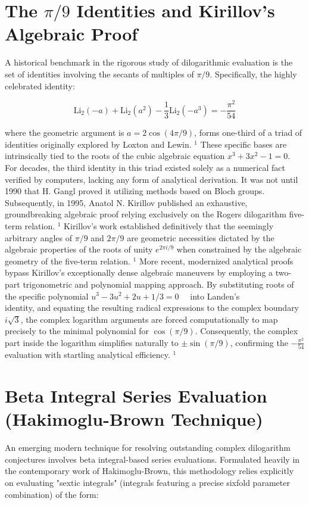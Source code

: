\documentclass[10pt]{article}
\begin{document}
\section*{The $\pi / 9$ Identities and Kirillov's Algebraic Proof}
A historical benchmark in the rigorous study of dilogarithmic evaluation is the set of identities involving the secants of multiples of $\pi / 9$. Specifically, the highly celebrated identity:

$$
\mathrm{Li}_{2}(-a)+\mathrm{Li}_{2}\left(a^{2}\right)-\frac{1}{3} \mathrm{Li}_{2}\left(-a^{3}\right)=-\frac{\pi^{2}}{54}
$$

where the geometric argument is $a=2 \cos (4 \pi / 9)$, forms one-third of a triad of identities originally explored by Loxton and Lewin. ${ }^{1}$ These specific bases are intrinsically tied to the roots of the cubic algebraic equation $x^{3}+3 x^{2}-1=0$.\\
For decades, the third identity in this triad existed solely as a numerical fact verified by computers, lacking any form of analytical derivation. It was not until 1990 that H. Gangl proved it utilizing methods based on Bloch groups. Subsequently, in 1995, Anatol N. Kirillov published an exhaustive, groundbreaking algebraic proof relying exclusively on the Rogers dilogarithm five-term relation. ${ }^{1}$ Kirillov's work established definitively that the seemingly arbitrary angles of $\pi / 9$ and $2 \pi / 9$ are geometric necessities dictated by the algebraic properties of the roots of unity $e^{2 \pi i / 9}$ when constrained by the algebraic geometry of the five-term relation. ${ }^{1}$ More recent, modernized analytical proofs bypass Kirillov's exceptionally dense algebraic maneuvers by employing a two-part trigonometric and polynomial mapping approach. By substituting roots of the specific polynomial $u^{3}-3 u^{2}+2 u+1 / 3=0 \quad$ into Landen's\\
identity, and equating the resulting radical expressions to the complex boundary $i \sqrt{3}$, the complex logarithm arguments are forced computationally to map precisely to the minimal polynomial for $\cos (\pi / 9)$. Consequently, the complex part inside the logarithm simplifies naturally to $\pm \sin (\pi / 9)$, confirming the $-\frac{\pi^{2}}{54}$ evaluation with startling analytical efficiency. ${ }^{1}$

\section*{Beta Integral Series Evaluation (Hakimoglu-Brown Technique)}
An emerging modern technique for resolving outstanding complex dilogarithm conjectures involves beta integral-based series evaluations. Formulated heavily in the contemporary work of Hakimoglu-Brown, this methodology relies explicitly on evaluating "sextic integrals" (integrals featuring a precise sixfold parameter combination) of the form:
\end{document}
